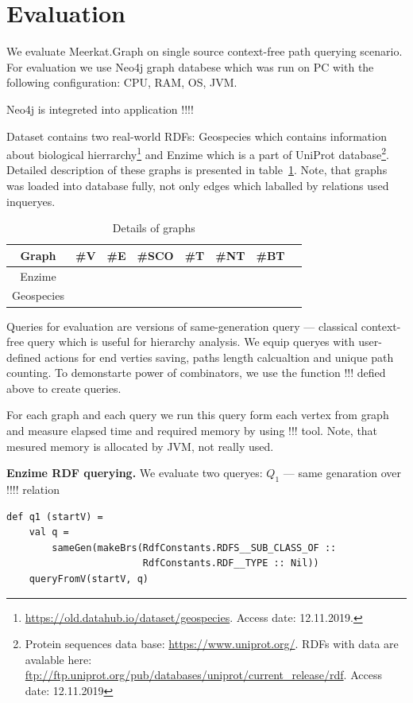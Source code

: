 \section{Evaluation}

We evaluate Meerkat.Graph on single source context-free path querying scenario.
For evaluation we use Neo4j graph databese which was run on PC with the following configuration: CPU, RAM, OS, JVM.

Neo4j is integreted into application !!!!

Dataset contains two real-world RDFs: Geospecies which contains information about biological hierrarchy\footnote{\url{https://old.datahub.io/dataset/geospecies}. Access date: 12.11.2019.} and Enzime which is a part of UniProt database\footnote{Protein sequences data base: \url{https://www.uniprot.org/}. RDFs with data are avalable here: \url{ftp://ftp.uniprot.org/pub/databases/uniprot/current_release/rdf}. Access date: 12.11.2019}.
Detailed description of these graphs is presented in table~\ref{tbl:datasetDetails}.
Note, that graphs was loaded into database fully, not only edges which laballed by relations used inqueryes.

\begin{table}[ht]
\begin{tabular}{|c|c|c|c|c|c|c|c|}
\hline
 Graph & \#V & \#E & \#SCO & \#T & \#NT & \#BT \\
 \hline
 Enzime &  &  &  &  & & \\
 Geospecies &  &  &  &  & & \\
 \hline
\end{tabular}
\caption{Details of graphs}
\label{tbl:datasetDetails}
\end{table}

Queries for evaluation are versions of same-generation query --- classical context-free query which is useful for hierarchy analysis.
We equip queryes with user-defined actions for end verties saving, paths length calcualtion and unique path counting.
To demonstarte power of combinators, we use the function !!! defied above to create queries.

For each graph and each query we run this query form each vertex from graph and measure elapsed time and required memory by using !!! tool.
Note, that mesured memory is allocated by JVM, not really used.


\textbf{Enzime RDF querying.} We evaluate two queryes: $Q_1$ --- same genaration over !!!! relation
\begin{lstlisting}
def q1 (startV) =
    val q =
        sameGen(makeBrs(RdfConstants.RDFS__SUB_CLASS_OF ::
                        RdfConstants.RDF__TYPE :: Nil))
    queryFromV(startV, q)
\end{lstlisting}

